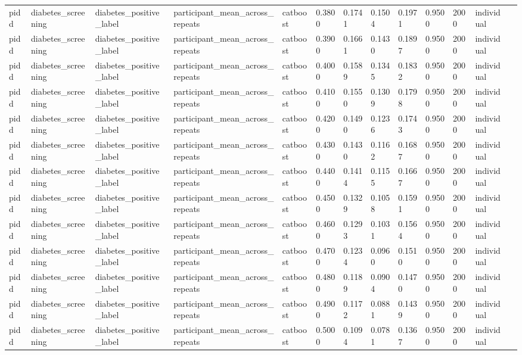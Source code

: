 \begin{tabular}{lllllllllllll}
pidd & diabetes\_screening & diabetes\_positive\_label & participant\_mean\_across\_repeats & catboost & 0.3800 & 0.1741 & 0.1504 & 0.1971 & 0.9500 & 2000 & individual &  \\
pidd & diabetes\_screening & diabetes\_positive\_label & participant\_mean\_across\_repeats & catboost & 0.3900 & 0.1661 & 0.1430 & 0.1897 & 0.9500 & 2000 & individual &  \\
pidd & diabetes\_screening & diabetes\_positive\_label & participant\_mean\_across\_repeats & catboost & 0.4000 & 0.1589 & 0.1345 & 0.1832 & 0.9500 & 2000 & individual &  \\
pidd & diabetes\_screening & diabetes\_positive\_label & participant\_mean\_across\_repeats & catboost & 0.4100 & 0.1550 & 0.1309 & 0.1798 & 0.9500 & 2000 & individual &  \\
pidd & diabetes\_screening & diabetes\_positive\_label & participant\_mean\_across\_repeats & catboost & 0.4200 & 0.1490 & 0.1236 & 0.1743 & 0.9500 & 2000 & individual &  \\
pidd & diabetes\_screening & diabetes\_positive\_label & participant\_mean\_across\_repeats & catboost & 0.4300 & 0.1430 & 0.1162 & 0.1687 & 0.9500 & 2000 & individual &  \\
pidd & diabetes\_screening & diabetes\_positive\_label & participant\_mean\_across\_repeats & catboost & 0.4400 & 0.1414 & 0.1155 & 0.1667 & 0.9500 & 2000 & individual &  \\
pidd & diabetes\_screening & diabetes\_positive\_label & participant\_mean\_across\_repeats & catboost & 0.4500 & 0.1329 & 0.1058 & 0.1591 & 0.9500 & 2000 & individual &  \\
pidd & diabetes\_screening & diabetes\_positive\_label & participant\_mean\_across\_repeats & catboost & 0.4600 & 0.1293 & 0.1031 & 0.1564 & 0.9500 & 2000 & individual &  \\
pidd & diabetes\_screening & diabetes\_positive\_label & participant\_mean\_across\_repeats & catboost & 0.4700 & 0.1234 & 0.0960 & 0.1510 & 0.9500 & 2000 & individual &  \\
pidd & diabetes\_screening & diabetes\_positive\_label & participant\_mean\_across\_repeats & catboost & 0.4800 & 0.1189 & 0.0904 & 0.1470 & 0.9500 & 2000 & individual &  \\
pidd & diabetes\_screening & diabetes\_positive\_label & participant\_mean\_across\_repeats & catboost & 0.4900 & 0.1172 & 0.0881 & 0.1439 & 0.9500 & 2000 & individual &  \\
pidd & diabetes\_screening & diabetes\_positive\_label & participant\_mean\_across\_repeats & catboost & 0.5000 & 0.1094 & 0.0781 & 0.1367 & 0.9500 & 2000 & individual &  \\

\end{tabular}
